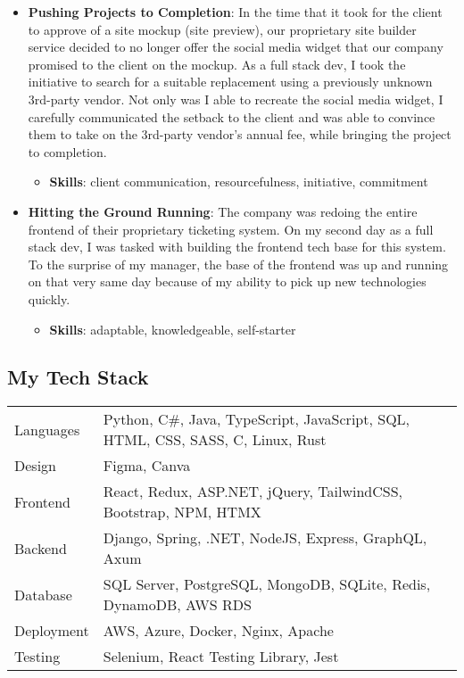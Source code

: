 \documentclass[letterpaper]{article}
\providecommand{\tightlist}{%
  \setlength{\itemsep}{0pt}\setlength{\parskip}{0pt}}
\begin{document}
\begin{itemize}
\tightlist
\item
  \textbf{Pushing Projects to Completion}: In the time that it took for
  the client to approve of a site mockup (site preview), our proprietary
  site builder service decided to no longer offer the social media
  widget that our company promised to the client on the mockup. As a
  full stack dev, I took the initiative to search for a suitable
  replacement using a previously unknown 3rd-party vendor. Not only was
  I able to recreate the social media widget, I carefully communicated
  the setback to the client and was able to convince them to take on the
  3rd-party vendor's annual fee, while bringing the project to
  completion.

  \begin{itemize}
  \tightlist
  \item
    \textbf{Skills}: client communication, resourcefulness, initiative,
    commitment
  \end{itemize}
\item
  \textbf{Hitting the Ground Running}: The company was redoing the
  entire frontend of their proprietary ticketing system. On my second
  day as a full stack dev, I was tasked with building the frontend tech
  base for this system. To the surprise of my manager, the base of the
  frontend was up and running on that very same day because of my
  ability to pick up new technologies quickly.

  \begin{itemize}
  \tightlist
  \item
    \textbf{Skills}: adaptable, knowledgeable, self-starter
  \end{itemize}
\end{itemize}

\hypertarget{my-tech-stack}{%
\subsection{My Tech Stack}\label{my-tech-stack}}

\begin{longtable}[]{@{}
  >{\raggedright\arraybackslash}p{}
  >{\raggedright\arraybackslash}p{}@{}}
\toprule\noalign{}
\endhead
\bottomrule\noalign{}
\endlastfoot
Languages & Python, C\#, Java, TypeScript, JavaScript, SQL, HTML, CSS,
SASS, C, Linux, Rust \\
Design & Figma, Canva \\
Frontend & React, Redux, ASP.NET, jQuery, TailwindCSS, Bootstrap, NPM,
HTMX \\
Backend & Django, Spring, .NET, NodeJS, Express, GraphQL, Axum \\
Database & SQL Server, PostgreSQL, MongoDB, SQLite, Redis, DynamoDB, AWS
RDS \\
Deployment & AWS, Azure, Docker, Nginx, Apache \\
Testing & Selenium, React Testing Library, Jest \\
\end{longtable}
\end{document}
